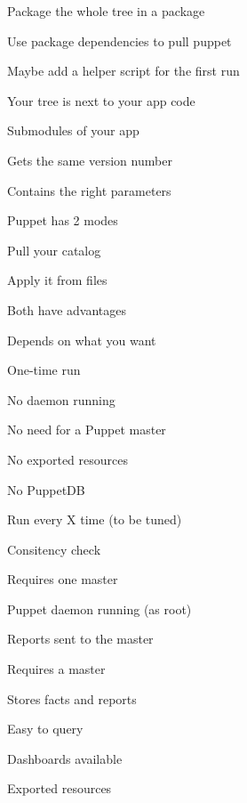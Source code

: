\begin{iframe}
\item Package the whole tree in a package
\item Use package dependencies to pull puppet
\item Maybe add a helper script for the first run
\end{iframe}

\begin{iframe}
\item Your tree is next to your app code
\item Submodules of your app
\item Gets the same version number
\item Contains the right parameters
\end{iframe}


\begin{iframe}
\item Puppet has 2 modes
\item Pull your catalog
\item Apply it from files
\item Both have advantages
\item Depends on what you want
\end{iframe}
\begin{iframe}
\item One-time run
\item No daemon running
\item No need for a Puppet master
\item No exported resources
\item No PuppetDB
\end{iframe}
\begin{iframe}
\item Run every X time (to be tuned)
\item Consitency check
\item Requires one master
\item Puppet daemon running (as root)
\item Reports sent to the master
\end{iframe}

\begin{iframe}[PuppetDB]
\item Requires a master
\item Stores facts and reports
\item Easy to query
\item Dashboards available
\item Exported resources
\end{iframe}

